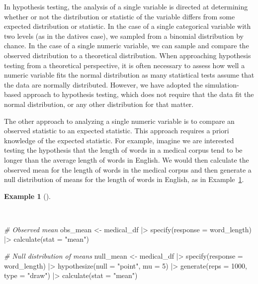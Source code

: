 \documentclass[
  letterpaper,
  DIV=11,
  numbers=noendperiod]{scrreprt}
\newenvironment{Shaded}{\begin{snugshade}}{\end{snugshade}}
\newcommand{\AttributeTok}[1]{\textcolor[rgb]{0.00,0.00,0.00}{#1}}
\newcommand{\CommentTok}[1]{\textcolor[rgb]{0.00,0.00,0.00}{\textit{#1}}}
\newcommand{\DecValTok}[1]{\textcolor[rgb]{0.00,0.00,0.00}{#1}}
\newcommand{\FunctionTok}[1]{\textcolor[rgb]{0.00,0.00,0.00}{#1}}
\newcommand{\NormalTok}[1]{\textcolor[rgb]{0.00,0.00,0.00}{#1}}
\newcommand{\OtherTok}[1]{\textcolor[rgb]{0.00,0.00,0.00}{#1}}
\newcommand{\SpecialCharTok}[1]{\textcolor[rgb]{0.00,0.00,0.00}{#1}}
\newcommand{\StringTok}[1]{\textcolor[rgb]{0.00,0.00,0.00}{#1}}
\theoremstyle{definition}
\newtheorem{example}{Example}[chapter]
\theoremstyle{remark}
\begin{document}
In hypothesis testing, the analysis of a single variable is directed at
determining whether or not the distribution or statistic of the variable
differs from some expected distribution or statistic. In the case of a
single categorical variable with two levels (as in the datives case), we
sampled from a binomial distribution by chance. In the case of a single
numeric variable, we can sample and compare the observed distribution to
a theoretical distribution. When approaching hypothesis testing from a
theoretical perspective, it is often necessary to assess how well a
numeric variable fits the normal distribution as many statistical tests
assume that the data are normally distributed. However, we have adopted
the simulation-based approach to hypothesis testing, which does not
require that the data fit the normal distribution, or any other
distribution for that matter.

The other approach to analyzing a single numeric variable is to compare
an observed statistic to an expected statistic. This approach requires a
priori knowledge of the expected statistic. For example, imagine we are
interested testing the hypothesis that the length of words in a medical
corpus tend to be longer than the average length of words in English. We
would then calculate the observed mean for the length of words in the
medical corpus and then generate a null distribution of means for the
length of words in English, as in
Example~\ref{exm-ida-num-uni-null-mean}.

\begin{example}[]\protect\hypertarget{exm-ida-num-uni-null-mean}{}\label{exm-ida-num-uni-null-mean}

~

\begin{Shaded}
\begin{Highlighting}[]
\CommentTok{\# Observed mean}
\NormalTok{obs\_mean }\OtherTok{\textless{}{-}}
\NormalTok{  medical\_df }\SpecialCharTok{|\textgreater{}}
  \FunctionTok{specify}\NormalTok{(}\AttributeTok{response =}\NormalTok{ word\_length) }\SpecialCharTok{|\textgreater{}}
  \FunctionTok{calculate}\NormalTok{(}\AttributeTok{stat =} \StringTok{"mean"}\NormalTok{)}

\CommentTok{\# Null distribution of means}
\NormalTok{null\_mean }\OtherTok{\textless{}{-}}
\NormalTok{  medical\_df }\SpecialCharTok{|\textgreater{}}
  \FunctionTok{specify}\NormalTok{(}\AttributeTok{response =}\NormalTok{ word\_length) }\SpecialCharTok{|\textgreater{}}
  \FunctionTok{hypothesize}\NormalTok{(}\AttributeTok{null =} \StringTok{"point"}\NormalTok{, }\AttributeTok{mu =} \DecValTok{5}\NormalTok{) }\SpecialCharTok{|\textgreater{}}
  \FunctionTok{generate}\NormalTok{(}\AttributeTok{reps =} \DecValTok{1000}\NormalTok{, }\AttributeTok{type =} \StringTok{"draw"}\NormalTok{) }\SpecialCharTok{|\textgreater{}}
  \FunctionTok{calculate}\NormalTok{(}\AttributeTok{stat =} \StringTok{"mean"}\NormalTok{)}
\end{Highlighting}
\end{Shaded}

\end{example}
\end{document}
